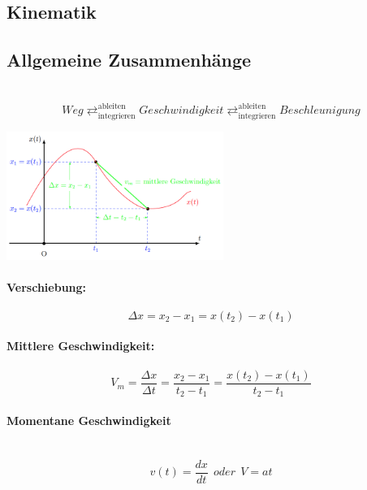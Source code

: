 \documentclass[7pt]{article}
\begin{document}
\begin{multicols*}{3}

\section{Kinematik}

\subsection{Allgemeine Zusammenh{\"a}nge}
\mbox{} \\
\[Weg \mathrel{\mathop{\rightleftarrows}^{\mathrm{ableiten}}_{\mathrm{integrieren}}} Geschwindigkeit \mathrel{\mathop{\rightleftarrows}^{\mathrm{ableiten}}_{\mathrm{integrieren}}} Beschleunigung\]
\newline

\begin{center}
	\includegraphics[width=200pt]{images/kinematik}
\end{center}

\paragraph{Verschiebung:}
\begin{equation*}
	{\Delta}x = x_2 - x_1 = x(t_2) - x(t_1) 
\end{equation*}

\paragraph{Mittlere Geschwindigkeit:}
\begin{equation*}
	V_m = \frac{{\Delta}x}{{\Delta}t} =  \frac{x_2 - x_1}{t_2 - t_1} = \frac{x(t_2) - x(t_1)}{t_2 - t_1}
\end{equation*}

\paragraph{Momentane Geschwindigkeit}\mbox{} \\
\begin{equation*}
	v(t) = \frac{dx}{dt}	 \>\>oder\>\> V = at
\end{equation*}


\end{multicols*}
\end{document}
